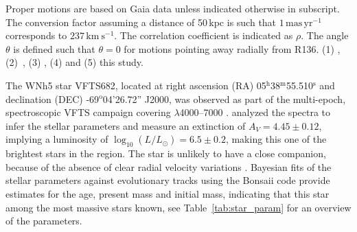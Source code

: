 \documentclass[apjl,twocolumn]{emulateapj}
\newcommand{\kms}{{\,\mathrm{km\ s^{-1}}}}
\newcommand{\masyr}{\,\mathrm{mas}\,\mathrm{yr}^{-1}}
\DeclareRobustCommand{\Tabref}[1]{Table~\ref{#1}}
\DeclareRobustCommand{\Secref}[1]{Sec.~\ref{#1}}
\begin{document}
\begin{table}
\begin{center}
\begin{tabular}{llc|c|c}
      \hline

    \end{tabular}
    \tablecomments
    { Proper motions are based on Gaia data unless indicated otherwise in subscript.    The conversion factor assuming a distance of 50\,kpc is such that $1\masyr$ corresponds to $237\kms$.  The correlation coefficient is indicated as $\rho$. The angle $\theta$ is defined such that $\theta=0$ for motions pointing away radially from R136.
      (1) \cite{brown:18},
      (2)~\cite{bestenlehner:11},
    (3) \cite{lennon:18}, 
    (4) \cite{platais:18} and
    (5) {\color{blue}this study}.
    }
  \end{center}
  \label{tab:vfts682}
\end{table}



The WNh5 star VFTS682, located at right ascension (RA)
05$^\mathrm{h}$38$^\mathrm{m}$55.510$^\mathrm{s}$  and declination
(DEC) \mbox{-69$^\mathrm{o}$04'26.72''} J2000, was observed as part of the multi-epoch, spectroscopic VFTS campaign covering $\lambda$4000--7000 \citep[][]{evans:11}. 
%
%
\citet{bestenlehner:11}  analyzed the spectra to infer the stellar parameters and measure an extinction of $A_V=4.45\pm0.12$, implying a luminosity of $\log_{10}(L/L_\odot) =  6.5\pm0.2$, making this one of the brightest stars in the region. The star is unlikely to have a close companion, because of the absence of clear radial velocity variations \citet{bestenlehner:11}.  Bayesian fits of the stellar parameters against evolutionary tracks \citep{brott:11, kohler:15} using the Bonsaii code \citep{schneider:17, schneider:18} provide estimates for the age, present mass and initial mass, indicating that this star among the most massive stars known, see \Tabref{tab:star_param} for an overview of the parameters.
\end{document}
